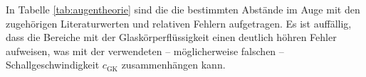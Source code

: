 In Tabelle \ref{tab:augentheorie} sind die die bestimmten Abstände im Auge mit den zugehörigen
Literaturwerten und relativen Fehlern aufgetragen.
Es ist auffällig, dass die Bereiche mit der Glaskörperflüssigkeit einen deutlich höhren
Fehler aufweisen, was mit der verwendeten -- möglicherweise falschen --
Schallgeschwindigkeit $c_{\mathrm{GK}}$
zusammenhängen kann.
\FloatBarrier
\newpage
